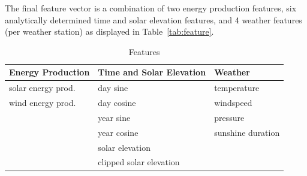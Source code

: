\documentclass[11pt,table]{article}
\begin{document}
The final feature vector is a combination of two energy production features, six analytically determined time and solar elevation features, and 4 weather features (per weather station) as displayed in Table~\ref{tab:feature}.

\begin{table}[]
\begin{center}
\begin{tabular}{p{4.5cm}|p{5cm}|p{4.5cm}}
\toprule
\textbf{Energy Production} & \textbf{Time and Solar Elevation} & \textbf{Weather}              \\
\midrule
solar energy prod. & day sine                 & temperature          \\
wind energy prod.  & day cosine               & windspeed            \\
                   & year sine                & pressure             \\
                   & year cosine              & sunshine duration    \\
                   & solar elevation          &                      \\
                   & clipped solar elevation  &                     \\ \bottomrule
\end{tabular}
\end{center}
\caption{Features}
\label{tab:features}
\end{table}
\end{document}
